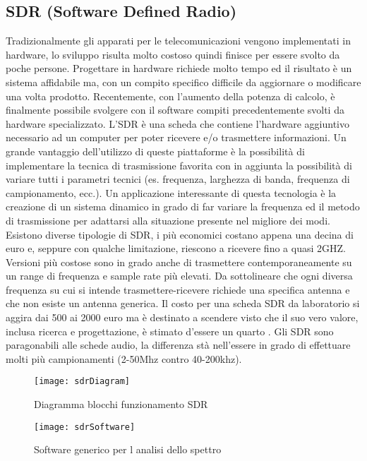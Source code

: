 \begin{itemize}
\chapter{SDR (Software Defined Radio)} Tradizionalmente gli apparati per le telecomunicazioni vengono implementati in hardware, lo sviluppo risulta molto costoso quindi finisce per essere svolto da poche persone. Progettare in hardware richiede molto tempo ed il risultato è un sistema affidabile ma, con un compito specifico difficile da aggiornare o modificare una volta prodotto. Recentemente, con l'aumento della potenza di calcolo, è finalmente possibile svolgere con il software compiti precedentemente svolti da hardware specializzato. L'SDR è una scheda che contiene l'hardware aggiuntivo necessario ad un computer per poter ricevere e/o trasmettere informazioni. Un grande vantaggio dell'utilizzo di queste piattaforme è la possibilità di implementare la tecnica di trasmissione favorita con in aggiunta la possibilità di variare tutti i parametri tecnici (es. frequenza, larghezza di banda, frequenza di campionamento, ecc.). Un applicazione interessante di questa tecnologia è la creazione di un sistema dinamico in grado di far variare la frequenza ed il metodo di trasmissione per adattarsi alla situazione presente nel migliore dei modi. Esistono diverse tipologie di SDR, i più economici costano appena una decina di euro e, seppure con qualche limitazione, riescono a ricevere fino a quasi 2GHZ. Versioni più costose sono in grado anche di trasmettere contemporaneamente su un range di frequenza e sample rate più elevati. Da sottolineare che ogni diversa frequenza su cui si intende trasmettere-ricevere richiede una specifica antenna e che non esiste un antenna generica.
Il costo per una scheda SDR da laboratorio si aggira dai 500 ai 2000 euro ma è destinato a scendere visto che il suo vero valore, inclusa ricerca e progettazione, è stimato d'essere un quarto \cite{SdrDrugs}.
Gli SDR sono paragonabili alle schede audio, la differenza stà nell'essere in grado di effettuare molti più campionamenti (2-50Mhz contro 40-200khz).
\begin{figure}[h]
	\centering
	\begin{minipage}[b]{.5\columnwidth}
		\texttt{[image: sdrDiagram]}
		\caption{Diagramma blocchi funzionamento SDR \cite{sdrDiagram}}\label{fig:1}
	\end{minipage}\hfill
	\begin{minipage}[b]{.4\columnwidth}
		\texttt{[image: sdrSoftware]}
		\caption{Software generico per l analisi dello spettro \cite{sdrSoftware}}\label{fig:1}

\end{minipage}
\end{figure}
\end{itemize}
